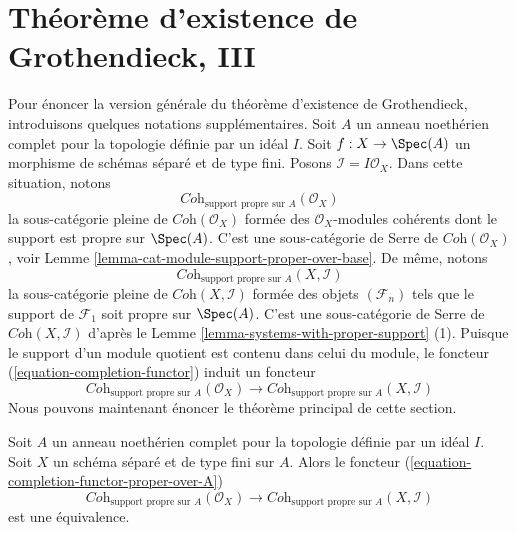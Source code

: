 \section{Théorème d'existence de Grothendieck, III}
\label{section-existence-proper-support}

\noindent
Pour énoncer la version générale du théorème d'existence de Grothendieck,
introduisons quelques notations supplémentaires. Soit $A$ un anneau noethérien
complet pour la topologie définie par un idéal $I$. Soit $f : X \to \Spec(A)$
un morphisme de schémas séparé et de type fini. Posons
$\mathcal{I} = I\mathcal{O}_X$. Dans cette situation, notons
$$
\textit{Coh}_{\text{support propre sur } A}(\mathcal{O}_X)
$$
la sous-catégorie pleine de $\textit{Coh}(\mathcal{O}_X)$
formée des $\mathcal{O}_X$-modules cohérents dont le
support est propre sur $\Spec(A)$. C'est une sous-catégorie de Serre de
$\textit{Coh}(\mathcal{O}_X)$, voir
Lemme \ref{lemma-cat-module-support-proper-over-base}.
De même, notons
$$
\textit{Coh}_{\text{support propre sur } A}(X, \mathcal{I})
$$
la sous-catégorie pleine de $\textit{Coh}(X, \mathcal{I})$
formée des objets $(\mathcal{F}_n)$ tels que
le support de $\mathcal{F}_1$ soit propre sur $\Spec(A)$.
C'est une sous-catégorie de Serre de $\textit{Coh}(X, \mathcal{I})$
d'après le Lemme \ref{lemma-systems-with-proper-support} (1).
Puisque le support d'un module quotient est contenu dans celui
du module, le foncteur (\ref{equation-completion-functor})
induit un foncteur
\begin{equation}
\label{equation-completion-functor-proper-over-A}
\textit{Coh}_{\text{support propre sur }A}(\mathcal{O}_X)
\longrightarrow
\textit{Coh}_{\text{support propre sur }A}(X, \mathcal{I})
\end{equation}
Nous pouvons maintenant énoncer le théorème principal de cette section.

\begin{theorem}
\label{theorem-grothendieck-existence}
\begin{reference}
\cite[III Theorem 5.1.5]{EGA}
\end{reference}
Soit $A$ un anneau noethérien complet pour la topologie définie par un idéal $I$.
Soit $X$ un schéma séparé et de type fini sur $A$. Alors
le foncteur
(\ref{equation-completion-functor-proper-over-A})
$$
\textit{Coh}_{\text{support propre sur }A}(\mathcal{O}_X)
\longrightarrow
\textit{Coh}_{\text{support propre sur }A}(X, \mathcal{I})
$$
est une équivalence.
\end{theorem}

